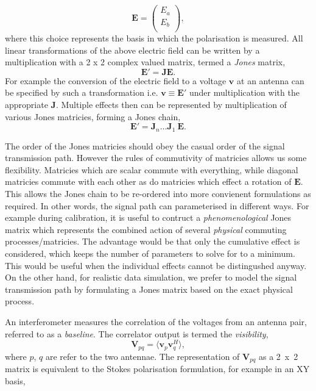 \begin{equation*}
\bm{E} = \left(
\begin{array}{c}
E_a \\
E_b \\
\end{array} \right),
\end{equation*}
\noindent where this choice represents the basis in which the polarisation is measured. All linear transformations of the above electric field can be written by a multiplication with a 2 x 2 complex valued matrix, termed a \emph{Jones} matrix,
\begin{equation}
\bm{E'} = \bm{J E}.
\end{equation}
For example the conversion of the electric field to a voltage $\bm{v}$ at an antenna can be specified by such a transformation i.e. $\bm{v} \equiv \bm{E'}$ under multiplication with the appropriate $\bm{J}$. Multiple effects then can be represented by multiplication of various Jones matricies, forming a Jones chain,
\begin{equation}
\bm{E'} = \bm{J}_n \ldots \bm{J}_1\ \bm{E}.
\end{equation}

The order of the Jones matricies should obey the casual order of the signal transmission path. However the rules of commutivity of matricies allows us some flexibility. Matricies which are scalar commute with everything, while diagonal matricies commute with each other as do matricies which effect a rotation of $\bm{E}$. This allows the Jones chain to be re-ordered into more convienent formulations as required. In other words, the signal path can parameterised in different ways. For example during calibration, it is useful to contruct a \emph{phenomenological} Jones matrix which represents the combined action of several \emph{physical} commuting processes/matricies. The advantage would be that only the cumulative effect is considered, which keeps the number of parameters to solve for to a minimum. This would be useful when the individual effects cannot be distingushed anyway. On the other hand, for realistic data simulation, we prefer to model the signal transmission path by formulating a Jones matrix based on the exact physical process.


An interferometer measures the correlation of the voltages from an antenna pair, referred to as a  \emph{baseline}. The correlator output is termed the \emph{visibility}, 
\begin{equation}
\bm{V}_{pq} = \langle {\bm v}_p  {\bm v}_q^H \rangle,
\end{equation}
where $p$, $q$ are refer to the two antennae. The representation of  $\bm{V}_{pq}$ as a 2~x~2 matrix is equivalent to the Stokes polarisation formulation, for example in an XY basis,



